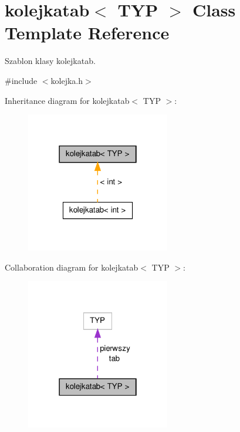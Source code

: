 \hypertarget{classkolejkatab}{\section{kolejkatab$<$ T\-Y\-P $>$ Class Template Reference}
\label{classkolejkatab}
}


Szablon klasy kolejkatab.  




{\ttfamily \#include $<$kolejka.\-h$>$}



Inheritance diagram for kolejkatab$<$ T\-Y\-P $>$\-:\nopagebreak
\begin{figure}[H]
\begin{center}
\leavevmode
\includegraphics[width=178pt]{classkolejkatab__inherit__graph}
\end{center}
\end{figure}


Collaboration diagram for kolejkatab$<$ T\-Y\-P $>$\-:\nopagebreak
\begin{figure}[H]
\begin{center}
\leavevmode
\includegraphics[width=178pt]{classkolejkatab__coll__graph}
\end{center}
\end{figure}
